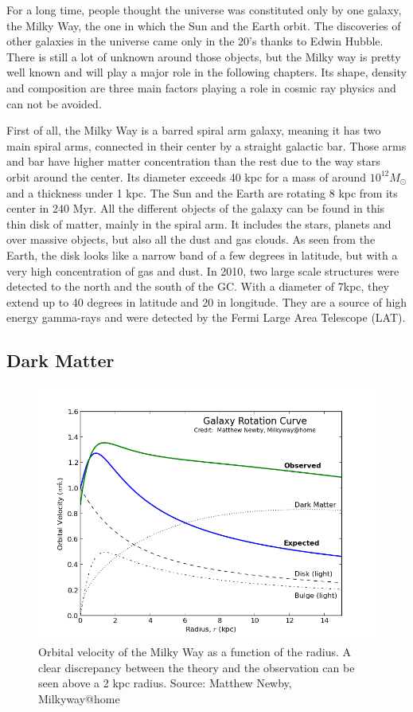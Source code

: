 For a long time, people thought the universe was constituted only by one galaxy, the Milky Way, the one in which the Sun and the Earth orbit. The discoveries of other galaxies in the universe came only in the 20's thanks to Edwin Hubble. There is still a lot of unknown  around those objects, but the Milky way is pretty well known and will play a major role in the following chapters. Its shape, density and composition are three main factors playing a role in cosmic ray physics and can not be avoided.

First of all, the Milky Way is a barred spiral arm galaxy, meaning it has two main spiral arms, connected in their center by a straight galactic bar. Those arms and bar have higher matter concentration than the rest due to the way stars orbit around the center. Its diameter exceeds 40 kpc for a mass of around $10^{12} M_\odot$ and a thickness under 1 kpc. The Sun and the Earth are rotating 8 kpc from its center in 240 Myr.
All the different objects of the galaxy can be found in this thin disk of matter, mainly in the spiral arm. It includes the stars, planets and over massive objects, but also all the dust and gas clouds. As seen from the Earth, the disk looks like a narrow band of a few degrees in latitude, but with a very high concentration of gas and dust.
In 2010, two large scale structures were detected to the north and the south of the GC. With a diameter of 7kpc, they extend up to 40 degrees in latitude and 20 in longitude. They are a source of high energy gamma-rays and were detected by the Fermi Large Area Telescope (LAT).


\subsection{Dark Matter}

\begin{figure}[h]
 \centering
 \includegraphics[width=.5\linewidth]{pic/theory/gal_rotation_curve.png}
 \caption{Orbital velocity of the Milky Way as a function of the radius. A clear discrepancy between the theory and the observation can be seen above a 2 kpc radius. Source: Matthew Newby, Milkyway@home}
 \label{fig:gal_rotation_curve}
\end{figure}


